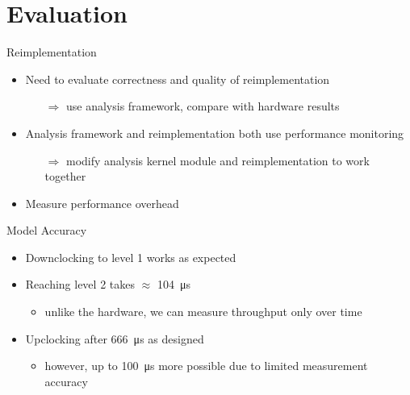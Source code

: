 \section{Evaluation}
\begin{frame}[t]{Reimplementation}
	\begin{itemize}
		\item Need to evaluate correctness and quality of reimplementation
		\begin{itemize}
			\item[$\Rightarrow$] use analysis framework, compare with hardware results
		\end{itemize}
		\item Analysis framework and reimplementation both use performance monitoring
		\begin{itemize}
			\item[$\Rightarrow$] modify analysis kernel module and reimplementation to work together
		\end{itemize}
		\item Measure performance overhead
	\end{itemize}
\end{frame}

\begin{frame}[t]{Model Accuracy}
	\begin{itemize}
		\item Downclocking to level 1 works as expected
		\item Reaching level 2 takes $\approx$ \SI{104}{\micro\second}
		\begin{itemize}
			\item unlike the hardware, we can measure throughput only over time
		\end{itemize}
		\item Upclocking after \SI{666}{\micro\second} as designed
		\begin{itemize}
			\item however, up to \SI{100}{\micro\second} more possible due to limited measurement accuracy
		\end{itemize}
	\end{itemize}
\end{frame}

